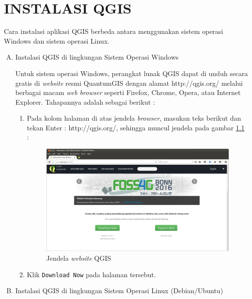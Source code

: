 \chapter{INSTALASI QGIS}

Cara instalasi aplikasi QGIS berbeda antara menggunakan sistem operasi Windows dan sistem operasi Linux.

\begin{enumerate}[A.]

\item Instalasi QGIS di lingkungan Sistem Operasi Windows

Untuk sistem operasi Windows, perangkat lunak QGIS dapat di unduh secara gratis di \textit{website} resmi QuantumGIS dengan alamat http://qgis.org/ melalui berbagai macam \textit{web browser} seperti Firefox, Chrome, Opera, atau Internet Explorer. Tahapannya adalah sebagai berikut :

\begin{enumerate}[1.]

\item Pada kolom halaman di atas jendela \textit{browser}, masukan teks berikut dan tekan Enter : http://qgis.org/, sehingga muncul jendela pada gambar \ref{fig:qgishomepage} :

\begin{figure}
  \centering
  \includegraphics[width=1\textwidth]{./resources/001-homepage-qgis}
  \caption{Jendela \textit{website} QGIS}
  \label{fig:qgishomepage}
\end{figure}

\item Klik \verb|Download Now| pada halaman tersebut.

\end{enumerate}

\item Instalasi QGIS di lingkungan Sistem Operasi Linux (Debian/Ubuntu)

\end{enumerate}
